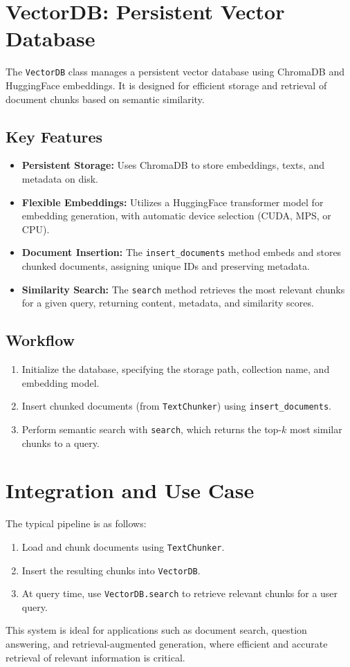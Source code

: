 \documentclass{article}
\begin{document}
\section{VectorDB: Persistent Vector Database}
The \texttt{VectorDB} class manages a persistent vector database using ChromaDB and HuggingFace embeddings. It is designed for efficient storage and retrieval of document chunks based on semantic similarity.

\subsection*{Key Features}
\begin{itemize}
    \item \textbf{Persistent Storage:} Uses ChromaDB to store embeddings, texts, and metadata on disk.
    \item \textbf{Flexible Embeddings:} Utilizes a HuggingFace transformer model for embedding generation, with automatic device selection (CUDA, MPS, or CPU).
    \item \textbf{Document Insertion:} The \texttt{insert\_documents} method embeds and stores chunked documents, assigning unique IDs and preserving metadata.
    \item \textbf{Similarity Search:} The \texttt{search} method retrieves the most relevant chunks for a given query, returning content, metadata, and similarity scores.
\end{itemize}

\subsection*{Workflow}
\begin{enumerate}
    \item Initialize the database, specifying the storage path, collection name, and embedding model.
    \item Insert chunked documents (from \texttt{TextChunker}) using \texttt{insert\_documents}.
    \item Perform semantic search with \texttt{search}, which returns the top-$k$ most similar chunks to a query.
\end{enumerate}

\section{Integration and Use Case}
The typical pipeline is as follows:
\begin{enumerate}
    \item Load and chunk documents using \texttt{TextChunker}.
    \item Insert the resulting chunks into \texttt{VectorDB}.
    \item At query time, use \texttt{VectorDB.search} to retrieve relevant chunks for a user query.
\end{enumerate}
This system is ideal for applications such as document search, question answering, and retrieval-augmented generation, where efficient and accurate retrieval of relevant information is critical.
\end{document}
